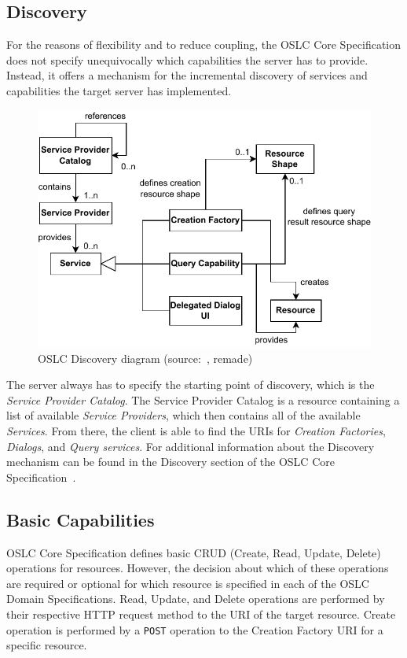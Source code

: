 \subsection*{Discovery}
For the reasons of flexibility and to reduce coupling, the OSLC Core Specification does not specify unequivocally which capabilities the server has to provide. Instead, it offers a mechanism for the incremental discovery of services and capabilities the target server has implemented.

\begin{figure}[hbt]
  \centering
  \includegraphics[width=.8 \linewidth]{figures/oslc-discovery.pdf}
  \caption{OSLC Discovery diagram (source: \cite{oslc_core_discovery}, remade)}
  \label{fig:oslc_discovery}
\end{figure}

The server always has to specify the starting point of discovery, which is the \emph{Service Provider Catalog}. The Service Provider Catalog is a resource containing a list of available \emph{Service Providers}, which then contains all of the available \emph{Services}. From there, the client is able to find the URIs for \emph{Creation Factories}, \emph{Dialogs}, and \emph{Query services}. For additional information about the Discovery mechanism can be found in the Discovery section of the OSLC Core Specification \cite{oslc_core_discovery}.


\subsection*{Basic Capabilities}
OSLC Core Specification defines basic CRUD (Create, Read, Update, Delete) operations for resources. However, the decision about which of these operations are required or optional for which resource is specified in each of the OSLC Domain Specifications. Read, Update, and Delete operations are performed by their respective HTTP request method to the URI of the target resource. Create operation is performed by a \texttt{POST} operation to the Creation Factory URI for a specific resource.

